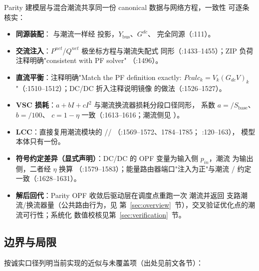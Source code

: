 Parity 建模层与混合潮流共享同一份 canonical 数据与网络方程，一致性
可逐条核实：

\begin{itemize}
\item \textbf{同源装配}： 与潮流一样经
   投影，$Y_{\mathrm{bus}}$、$G^{dc}$、
   完全同源（:111）。
\item \textbf{交流注入}：$P^{net}$/$Q^{net}$ 极坐标方程与潮流失配式
  同形（:1433--1455）；ZIP 负荷注释明确"consistent with PF solver"
  （:1496）。
\item \textbf{直流平衡}：注释明确"Match the PF definition exactly:
  $Pcalc_k=V_k(G_{dc}V)_k$"（:1510--1512）；DC/DC 折入注释说明镜像
   的做法（:1526--1527）。
\item \textbf{VSC 损耗}：$a+bI+cI^2$ 与潮流换流器损耗分段口径同形，
  系数 $a=$$/S_{\mathrm{base}}$、$b=$$/100$、
  $c=1-\eta$ 一致（:1613--1616；潮流侧见
  ）。
\item \textbf{LCC}：直接复用潮流模块的
  //
  （:1569--1572、1784--1785；
  :120--163），
  模型本体只有一份。
\item \textbf{符号约定差异（显式声明）}：DC/DC 的 OPF 变量为输入侧
  $p_{in}$，潮流  为输出侧，二者经 $\eta$ 换算
  （:1579--1583）；能量路由器端口"注入为正"与潮流
  / 约定一致（:1628--1631）。
\item \textbf{解后回代}：Parity OPF 收敛后驱动层在调度点重跑一次
  潮流并返回  支路潮流/换流器量（公共路由行为，见
  第~\ref{sec:overview}~节），交叉验证优化点的潮流可行性；系统化
  数值校核见第~\ref{sec:verification}~节。
\end{itemize}

\subsection{边界与局限}

按诚实口径列明当前实现的近似与未覆盖项（出处见前文各节）：

